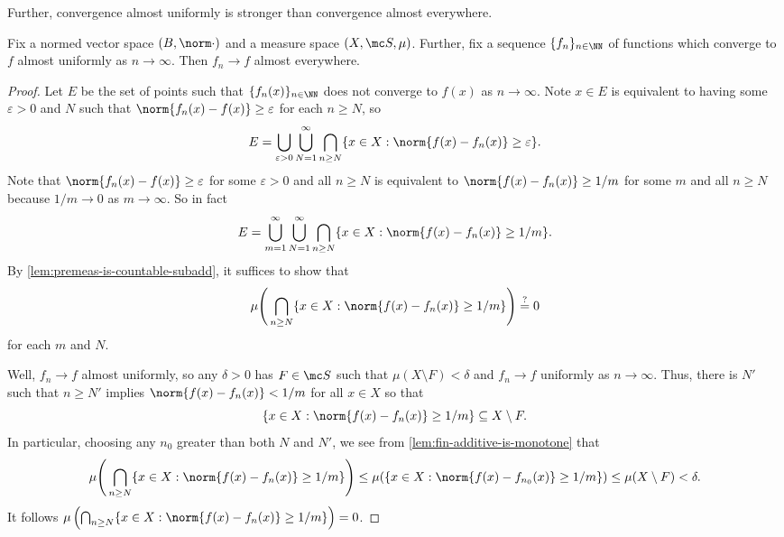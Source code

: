 \documentclass[../notes.tex]{subfiles}
\begin{document}
Further, convergence almost uniformly is stronger than convergence almost everywhere.
\begin{lemma} \label{lem:almost-uniform-to-almost-everywhere}
	Fix a normed vector space $(B,\norm\cdot)$ and a measure space $(X,\mc S,\mu)$. Further, fix a sequence $\{f_n\}_{n\in\NN}$ of functions which converge to $f$ almost uniformly as $n\to\infty$. Then $f_n\to f$ almost everywhere.
\end{lemma}
\begin{proof}
	Let $E$ be the set of points such that $\{f_n(x)\}_{n\in\NN}$ does not converge to $f(x)$ as $n\to\infty$. Note $x\in E$ is equivalent to having some $\varepsilon>0$ and $N$ such that $\norm{f_n(x)-f(x)}\ge\varepsilon$ for each $n\ge N$, so
	\[E=\bigcup_{\varepsilon>0}\bigcup_{N=1}^\infty\bigcap_{n\ge N}\{x\in X:\norm{f(x)-f_n(x)}\ge\varepsilon\}.\]
	Note that $\norm{f_n(x)-f(x)}\ge\varepsilon$ for some $\varepsilon>0$ and all $n\ge N$ is equivalent to $\norm{f(x)-f_n(x)}\ge1/m$ for some $m$ and all $n\ge N$ because $1/m\to0$ as $m\to\infty$. So in fact
	\[E=\bigcup_{m=1}^\infty\bigcup_{N=1}^\infty\bigcap_{n\ge N}\{x\in X:\norm{f(x)-f_n(x)}\ge1/m\}.\]
	By \autoref{lem:premeas-is-countable-subadd}, it suffices to show that
	\[\mu\Bigg(\bigcap_{n\ge N}\{x\in X:\norm{f(x)-f_n(x)}\ge1/m\}\Bigg)\stackrel?=0\]
	for each $m$ and $N$.
	
	Well, $f_n\to f$ almost uniformly, so any $\delta>0$ has $F\in\mc S$ such that $\mu(X\setminus F)<\delta$ and $f_n\to f$ uniformly as $n\to\infty$. Thus, there is $N'$ such that $n\ge N'$ implies $\norm{f(x)-f_n(x)}<1/m$ for all $x\in X$ so that
	\[\{x\in X:\norm{f(x)-f_n(x)}\ge1/m\}\subseteq X\setminus F.\]
	In particular, choosing any $n_0$ greater than both $N$ and $N'$, we see from \autoref{lem:fin-additive-is-monotone} that
	\[\mu\Bigg(\bigcap_{n\ge N}\{x\in X:\norm{f(x)-f_n(x)}\ge1/m\}\Bigg)\le\mu(\{x\in X:\norm{f(x)-f_{n_0}(x)}\ge1/m\})\le\mu(X\setminus F)<\delta.\]
	It follows $\mu\left(\bigcap_{n\ge N}\{x\in X:\norm{f(x)-f_n(x)}\ge1/m\}\right)=0$.
\end{proof}
\end{document}
